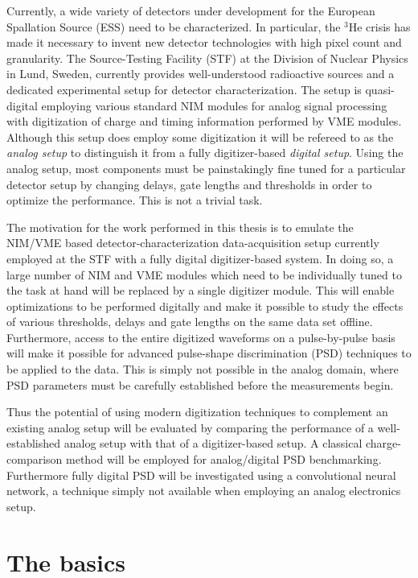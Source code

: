\documentclass[main.tex]{subfiles}
\begin{document}
Currently, a wide variety of detectors under development for the European Spallation Source (ESS) need to be characterized. In particular, the $^\textrm{3}$He crisis has made it necessary to invent new detector technologies with high pixel count and granularity. The Source-Testing Facility (STF) at the Division of Nuclear Physics in Lund, Sweden, currently provides well-understood radioactive sources and a dedicated experimental setup for detector characterization. 
The setup is quasi-digital employing various standard NIM modules for analog signal processing with digitization of charge and timing information performed by VME modules. Although this setup does employ some digitization it will be refereed to as the \textit{analog setup} to distinguish it from a fully digitizer-based \textit{digital setup}. Using the analog setup, most components must be painstakingly fine tuned for a particular detector setup by changing delays, gate lengths and thresholds in order to optimize the performance. This is not a trivial task. 

The motivation for the work performed in this thesis is to emulate the NIM/VME based detector-characterization data-acquisition setup currently employed at the STF with a fully digital digitizer-based  system. In doing so, a large number of NIM and VME modules which need to be individually tuned to the task at hand will be replaced by a single digitizer module. 
This will enable optimizations to be performed digitally and make it possible to study the effects of various thresholds, delays and gate lengths on the same data set offline. Furthermore, access to the entire digitized waveforms on a pulse-by-pulse basis will make it possible for advanced pulse-shape discrimination (PSD) techniques to be applied to the data. This is simply not possible in the analog domain, where PSD parameters must be carefully established before the measurements begin.

Thus the potential of using modern digitization techniques to complement an existing analog setup will be evaluated by comparing the performance of a well-established analog setup with that of a digitizer-based setup. A classical charge-comparison method will be employed for analog/digital PSD benchmarking. Furthermore fully digital PSD will be investigated using a convolutional neural network, a technique simply not available when employing an analog electronics setup.

\section{The basics}
\end{document}
